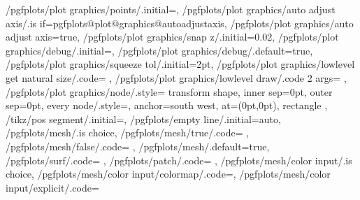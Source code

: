 {	%
	/pgfplots/plot graphics/points/.initial=,
	/pgfplots/plot graphics/auto adjust axis/.is if=pgfplots@plot@graphics@autoadjustaxis,
	/pgfplots/plot graphics/auto adjust axis=true,
	/pgfplots/plot graphics/snap z/.initial=0.02,
	/pgfplots/plot graphics/debug/.initial=,
	/pgfplots/plot graphics/debug/.default=true,
	/pgfplots/plot graphics/squeeze tol/.initial=2pt,
	/pgfplots/plot graphics/lowlevel get natural size/.code={%
		\pgfplots@plot@handler@graphics@getnaturalsize
	},
	/pgfplots/plot graphics/lowlevel draw/.code 2 args={%
	},%
	/pgfplots/plot graphics/node/.style={
		transform shape,
		inner sep=0pt,
		outer sep=0pt,
		every node/.style={},
		anchor=south west,
		at={(0pt,0pt)},
		rectangle
	},
	/tikz/pos segment/.initial=,
	/pgfplots/empty line/.initial=auto,
	/pgfplots/mesh/.is choice,
	/pgfplots/mesh/true/.code={%
		\def\pgfplots@meshmode{m}%
		\let\tikz@plot@handler=\pgfplotsplothandlermesh
	},
	/pgfplots/mesh/false/.code={
		\def\pgfplots@meshmode{n}%
		\ifx\tikz@plot@handler\pgfplotsplothandlermesh
			\let\tikz@plot@handler=\pgfplothandlerlineto
		\fi},
	/pgfplots/mesh/.default=true,
	/pgfplots/surf/.code={%
		\def\pgfplots@meshmode{s}%
	},%
	/pgfplots/patch/.code={%
	},%
	/pgfplots/mesh/color input/.is choice,
	/pgfplots/mesh/color input/colormap/.code=\def\pgfplotsplothandlermesh@colorinput{0},%
	/pgfplots/mesh/color input/explicit/.code={%
		\def\pgfplotsplothandlermesh@colorinput{1}%
		\def\pgfplotsplothandlermesh@colorinput@mathparse{0}%
		}}
